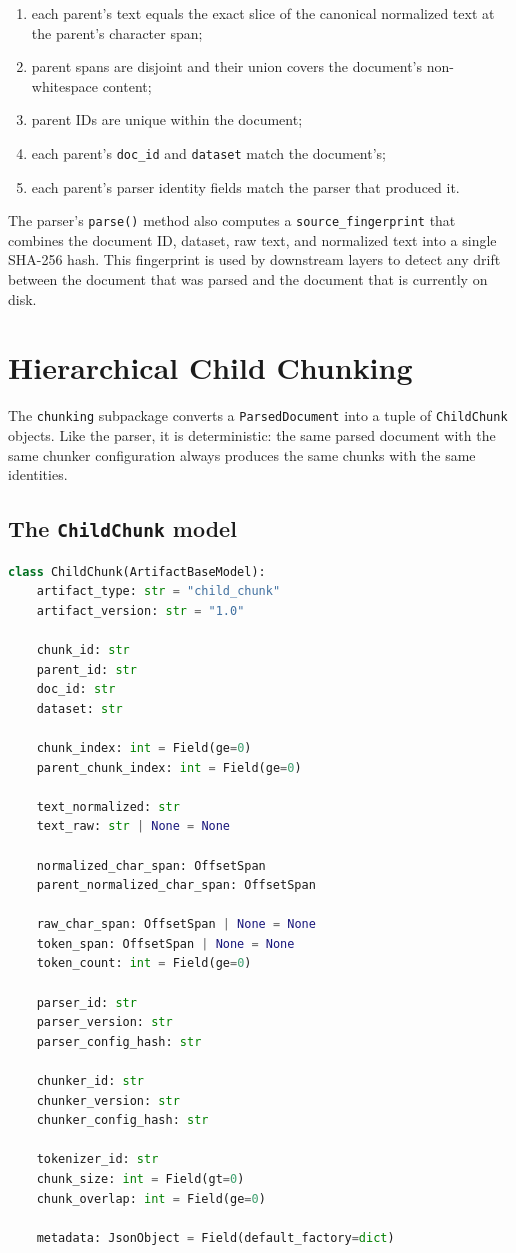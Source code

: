 \documentclass[11pt,a4paper]{article}
\begin{document}
\begin{enumerate}[leftmargin=1.5em,itemsep=0.15em]
  \item each parent's text equals the exact slice of the canonical
    normalized text at the parent's character span;
  \item parent spans are disjoint and their union covers the
    document's non-whitespace content;
  \item parent IDs are unique within the document;
  \item each parent's \texttt{doc\_id} and \texttt{dataset} match the
    document's;
  \item each parent's parser identity fields match the parser that
    produced it.
\end{enumerate}

The parser's \texttt{parse()} method also computes a
\texttt{source\_fingerprint} that combines the document ID, dataset,
raw text, and normalized text into a single SHA-256 hash. This
fingerprint is used by downstream layers to detect any drift between
the document that was parsed and the document that is currently on
disk.

\section{Hierarchical Child Chunking}\label{sec:chunking}

The \texttt{chunking} subpackage converts a \texttt{ParsedDocument}
into a tuple of \texttt{ChildChunk} objects. Like the parser, it is
deterministic: the same parsed document with the same chunker
configuration always produces the same chunks with the same
identities.

\subsection{The \texttt{ChildChunk} model}
\begin{lstlisting}[language=python]
class ChildChunk(ArtifactBaseModel):
    artifact_type: str = "child_chunk"
    artifact_version: str = "1.0"

    chunk_id: str
    parent_id: str
    doc_id: str
    dataset: str

    chunk_index: int = Field(ge=0)
    parent_chunk_index: int = Field(ge=0)

    text_normalized: str
    text_raw: str | None = None

    normalized_char_span: OffsetSpan
    parent_normalized_char_span: OffsetSpan

    raw_char_span: OffsetSpan | None = None
    token_span: OffsetSpan | None = None
    token_count: int = Field(ge=0)

    parser_id: str
    parser_version: str
    parser_config_hash: str

    chunker_id: str
    chunker_version: str
    chunker_config_hash: str

    tokenizer_id: str
    chunk_size: int = Field(gt=0)
    chunk_overlap: int = Field(ge=0)

    metadata: JsonObject = Field(default_factory=dict)
\end{lstlisting}
\end{document}
